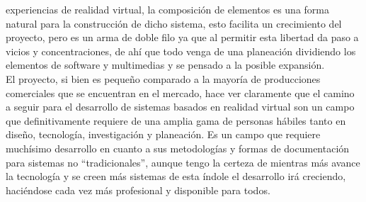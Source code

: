 experiencias de realidad virtual, la composición de elementos es una forma natural para la construcción de dicho sistema, esto facilita un crecimiento 
del proyecto, pero es un arma de doble filo ya que al permitir esta libertad da paso a vicios y concentraciones, de ahí que todo venga de una planeación 
dividiendo los elementos de software y multimedias y se pensado a la posible expansión.\\
El proyecto, si bien es pequeño comparado a la mayoría de producciones comerciales que se encuentran en el mercado, hace ver claramente que el camino 
a seguir para el desarrollo de sistemas basados en realidad virtual son un campo que definitivamente requiere de una amplia gama de personas hábiles tanto 
en diseño, tecnología, investigación y planeación. Es un campo que requiere muchísimo desarrollo en cuanto a sus metodologías y formas de documentación para 
sistemas no “tradicionales”, aunque tengo la certeza de mientras más avance la tecnología y se creen más sistemas de esta índole el desarrollo irá creciendo, 
haciéndose cada vez más profesional y disponible para todos.\\
